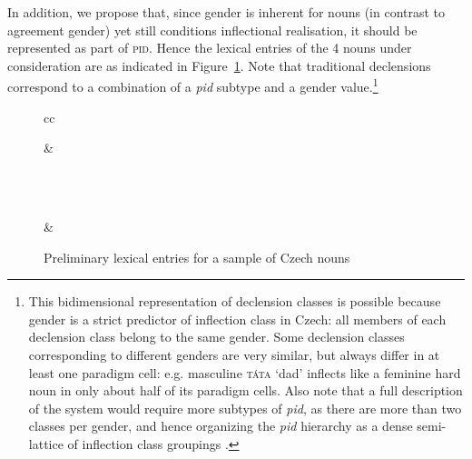 \documentclass[output=paper]{langsci/langscibook}
\begin{document}
In addition, we propose that, since gender is inherent for nouns (in
contrast to agreement gender) yet still conditions inflectional
realisation, it should be represented as part of \textsc{pid}. Hence
the lexical entries of the 4 nouns under consideration are as
indicated in Figure~\ref{fig:BonamiCrysmann:cz:le}. Note that traditional declensions
correspond to a combination of a \textit{pid} subtype and a gender
value.\footnote{This bidimensional representation of declension
  classes is possible because gender is a strict predictor of
  inflection class in Czech: all members of each declension class
  belong to the same gender. Some declension classes corresponding to
  different genders are very similar, but always differ in at least
  one paradigm cell: e.g. masculine \textsc{táta} `dad' inflects like a
  feminine hard noun in only about half of its paradigm cells. Also
  note that a full description of the system would require more
  subtypes of \emph{pid}, as there are more than two classes per
  gender, and hence organizing the \emph{pid} hierarchy as a dense
  semi-lattice of inflection class groupings \citep{Beniamine16}.}


\begin{figure}[htb]
\centering\smaller
\begin{tabular}{cc}
&
\\ \\
&
\end{tabular}
\caption{Preliminary lexical  entries for  a sample of Czech nouns\label{fig:BonamiCrysmann:cz:le}}
\end{figure}
\end{document}
